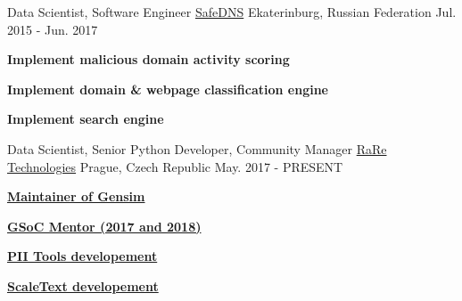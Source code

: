 


\begin{cventries}


\cventry
{Data Scientist, Software Engineer} %
{\href{https://www.safedns.com/en/}{SafeDNS}} %
{Ekaterinburg, Russian Federation} %
{Jul. 2015 - Jun. 2017} %
{ %
\begin{cvitems}
\item {\textbf{Implement malicious domain activity scoring}}
\item {\textbf{Implement domain \& webpage classification engine}}
\item {\textbf{Implement search engine}}
\end{cvitems}
}

\cventry
{Data Scientist, Senior Python Developer, Community Manager} %
{\href{https://rare-technologies.com/}{RaRe Technologies}} %
{Prague, Czech Republic} %
{May. 2017 - PRESENT}
{
\begin{cvitems}
\item {\textbf{\href{https://github.com/RaRe-Technologies/gensim}{Maintainer of Gensim}}}
\item {\textbf{\href{https://summerofcode.withgoogle.com/}{GSoC Mentor (2017 and 2018)}}}
\item {\textbf{\href{https://pii-tools.com/}{PII Tools developement}}}
\item {\textbf{\href{https://scaletext.com/}{ScaleText developement}}}
\end{cvitems}
}


\end{cventries}
